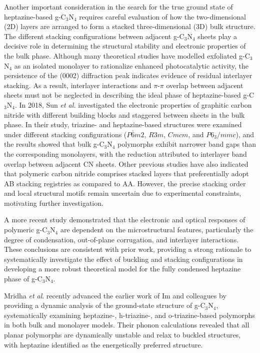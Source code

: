 Another important consideration in the search for the true ground state of heptazine-based g-C$_3$N$_4$  requires careful evaluation of how the two-dimensional (2D) layers are arranged to form a stacked three-dimensional (3D) bulk structure. The different stacking configurations between adjacent g-C$_3$N$_4$ sheets play a decisive role in determining the structural stability and electronic properties of the bulk phase. Although many theoretical studies\cite{Yang2021DFTApplications,Fu2024PotassiumInvestigation,Gorai2023InsightPrinciple} have modelled exfoliated  g-C$_3$N$_4$ as an isolated monolayer to rationalize enhanced photocatalytic activity, the persistence of the (0002) diffraction peak indicates evidence of residual interlayer stacking. As a result, interlayer interactions and $\pi$-$\pi$ overlap between adjacent sheets must not be neglected in describing the ideal phase of heptazine-based g-C$_3$N$_4$. In 2018, Sun \textit{et al.} \cite{Sun2018FirstArrangement} investigated the electronic properties of graphitic carbon nitride with different building blocks and staggered between sheets in the bulk phase. In their study, triazine- and heptazine-based structures were examined under different stacking configurations ($P\bar{6}m2$, $R3m$, $Cmcm$, and $P6_3/mmc$), and the results showed that bulk g-C$_3$N$_4$ polymorphs exhibit narrower band gaps than the corresponding monolayers, with the reduction attributed to interlayer band overlap between adjacent CN sheets. Other previous studies 
have also indicated that polymeric carbon nitride comprises stacked layers that preferentially adopt AB stacking registries as compared 
to AA.\cite{Hartley2021ComputationalSplitting,Zuluaga2015StructuralG-C3N4}
However, the precise stacking order and local structural motifs remain uncertain due to experimental constraints, motivating further investigation. 

A more recent study \cite{Im2025UnravelingTransitions} demonstrated that the electronic and optical responses of polymeric g-C$_3$N$_4$ are dependent on the microstructural features, particularly the degree of condensation, out-of-plane corrugation, and interlayer interactions. These conclusions are consistent with prior work,\cite{Im2023StructureSimulations,Negro2023CombinedProperties} providing a strong rationale to systematically investigate the effect of buckling and stacking configurations in developing a more robust theoretical model for the fully condensed heptazine phase of g-C$_3$N$_4$.

Mridha \textit{et al}. \cite{Mridha2025UsingG-C3N4} recently advanced the earlier work of Im and colleagues \cite{Im2025UnravelingTransitions} by providing a dynamic analysis of the ground-state structure of g-C$_3$N$_4$, systematically examining heptazine-, h-triazine-, and o-triazine-based polymorphs in both bulk and monolayer models. Their phonon calculations revealed that all planar polymorphs are dynamically unstable and relax to buckled structures, with heptazine identified as the energetically preferred structure. 

